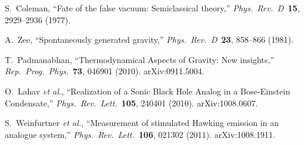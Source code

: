 S.~Coleman, ``Fate of the false vacuum: Semiclassical theory,'' \emph{Phys.\ Rev.\ D}\ \textbf{15}, 2929--2936 (1977).


A.~Zee, ``Spontaneously generated gravity,'' \emph{Phys.\ Rev.\ D}\ \textbf{23}, 858--866 (1981).

T.~Padmanabhan, ``Thermodynamical Aspects of Gravity: New insights,'' \emph{Rep.\ Prog.\ Phys.}\ \textbf{73}, 046901 (2010). arXiv:0911.5004.


O.~Lahav \emph{et al.}, ``Realization of a Sonic Black Hole Analog in a Bose-Einstein Condensate,'' \emph{Phys.\ Rev.\ Lett.}\ \textbf{105}, 240401 (2010). arXiv:1008.0607.

S.~Weinfurtner \emph{et al.}, ``Measurement of stimulated Hawking emission in an analogue system,'' \emph{Phys.\ Rev.\ Lett.}\ \textbf{106}, 021302 (2011). arXiv:1008.1911.


